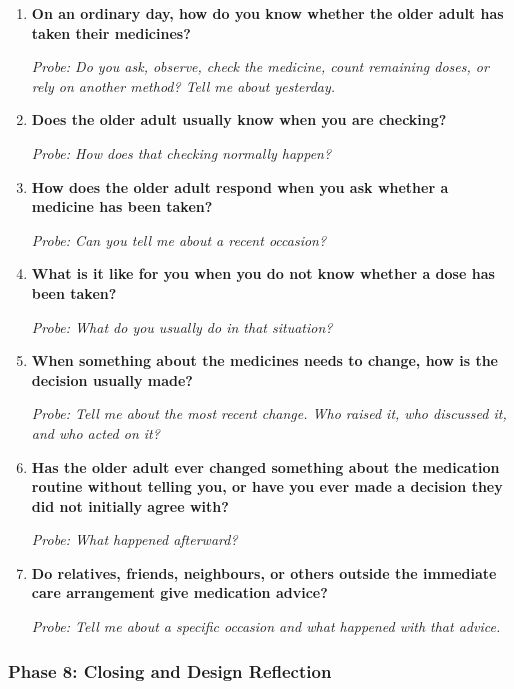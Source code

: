 \begin{enumerate}[resume]
  \item \textbf{On an ordinary day, how do you know whether the older adult has taken their medicines?}

  \textit{Probe: Do you ask, observe, check the medicine, count remaining doses, or rely on another method? Tell me about yesterday.}
  \item \textbf{Does the older adult usually know when you are checking?}

  \textit{Probe: How does that checking normally happen?}
  \item \textbf{How does the older adult respond when you ask whether a medicine has been taken?}

  \textit{Probe: Can you tell me about a recent occasion?}
  \item \textbf{What is it like for you when you do not know whether a dose has been taken?}

  \textit{Probe: What do you usually do in that situation?}
  \item \textbf{When something about the medicines needs to change, how is the decision usually made?}

  \textit{Probe: Tell me about the most recent change. Who raised it, who discussed it, and who acted on it?}
  \item \textbf{Has the older adult ever changed something about the medication routine without telling you, or have you ever made a decision they did not initially agree with?}

  \textit{Probe: What happened afterward?}
  \item \textbf{Do relatives, friends, neighbours, or others outside the immediate care arrangement give medication advice?}

  \textit{Probe: Tell me about a specific occasion and what happened with that advice.}
\end{enumerate}

\subsubsection{Phase 8: Closing and Design Reflection}

